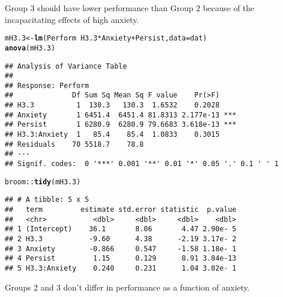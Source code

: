 \documentclass{article}\usepackage[]{graphicx}\usepackage[]{color}
\makeatletter
\newcommand{\hlopt}[1]{\textcolor[rgb]{0,0,0}{#1}}%
\newcommand{\hlstd}[1]{\textcolor[rgb]{0.345,0.345,0.345}{#1}}%
\newcommand{\hlkwb}[1]{\textcolor[rgb]{0.69,0.353,0.396}{#1}}%
\newcommand{\hlkwc}[1]{\textcolor[rgb]{0.333,0.667,0.333}{#1}}%
\newcommand{\hlkwd}[1]{\textcolor[rgb]{0.737,0.353,0.396}{\textbf{#1}}}%
\newenvironment{kframe}{%
 \def\at@end@of@kframe{}%
 \ifinner\ifhmode%
  \def\at@end@of@kframe{\end{minipage}}%
  \begin{minipage}{\columnwidth}%
 \fi\fi%
 \def\FrameCommand##1{\hskip\@totalleftmargin \hskip-\fboxsep
 \colorbox{shadecolor}{##1}\hskip-\fboxsep
     \hskip-\linewidth \hskip-\@totalleftmargin \hskip\columnwidth}%
 \MakeFramed {\advance\hsize-\width
   \@totalleftmargin\z@ \linewidth\hsize
   \@setminipage}}%
 {\par\unskip\endMakeFramed%
 \at@end@of@kframe}
\newenvironment{knitrout}{}{} %
\makeatother
\begin{document}
Group 3 should have lower performance than Group 2 because of the incapacitating effects of high anxiety.
\begin{knitrout}
\color{fgcolor}\begin{kframe}
\begin{alltt}
\hlstd{mH3.3} \hlkwb{<-} \hlkwd{lm}\hlstd{(Perform} \hlopt{~} \hlstd{H3.3}\hlopt{*}\hlstd{Anxiety} \hlopt{+} \hlstd{Persist,} \hlkwc{data} \hlstd{= dat)}
\hlkwd{anova}\hlstd{(mH3.3)}
\end{alltt}
\begin{verbatim}
## Analysis of Variance Table
## 
## Response: Perform
##              Df Sum Sq Mean Sq F value    Pr(>F)    
## H3.3          1  130.3   130.3  1.6532    0.2028    
## Anxiety       1 6451.4  6451.4 81.8313 2.177e-13 ***
## Persist       1 6280.9  6280.9 79.6683 3.618e-13 ***
## H3.3:Anxiety  1   85.4    85.4  1.0833    0.3015    
## Residuals    70 5518.7    78.8                      
## ---
## Signif. codes:  0 '***' 0.001 '**' 0.01 '*' 0.05 '.' 0.1 ' ' 1
\end{verbatim}
\begin{alltt}
\hlstd{broom}\hlopt{::}\hlkwd{tidy}\hlstd{(mH3.3)}
\end{alltt}
\begin{verbatim}
## # A tibble: 5 x 5
##   term         estimate std.error statistic  p.value
##   <chr>           <dbl>     <dbl>     <dbl>    <dbl>
## 1 (Intercept)    36.1       8.06       4.47 2.90e- 5
## 2 H3.3           -9.60      4.38      -2.19 3.17e- 2
## 3 Anxiety        -0.866     0.547     -1.58 1.18e- 1
## 4 Persist         1.15      0.129      8.91 3.84e-13
## 5 H3.3:Anxiety    0.240     0.231      1.04 3.02e- 1
\end{verbatim}
\end{kframe}
\end{knitrout}

Groups 2 and 3 don't differ in performance as a function of anxiety.
\end{document}
